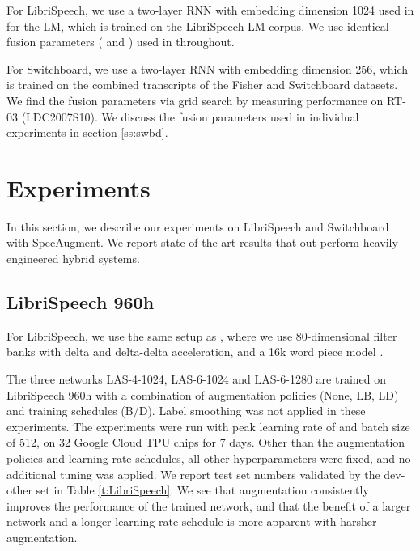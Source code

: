 \documentclass[a4paper]{article}
\begin{document}
For LibriSpeech, we use a two-layer RNN with embedding dimension 1024 used in \cite{irie-arxiv-2019} for the LM, which is trained on the LibriSpeech LM corpus. We use identical fusion parameters ( and ) used in \cite{irie-arxiv-2019} throughout.

For Switchboard, we use a two-layer RNN with embedding dimension 256, which is trained on the combined transcripts of the Fisher and Switchboard datasets. We find the fusion parameters via grid search by measuring performance on RT-03 (LDC2007S10). We discuss the fusion parameters used in individual experiments in section \ref{ss:swbd}.

\section{Experiments}

In this section, we describe our experiments on LibriSpeech and Switchboard with SpecAugment. We report state-of-the-art results that out-perform heavily engineered hybrid systems.

\subsection{LibriSpeech 960h} \label{ss:librispeech}

For LibriSpeech, we use the  same setup as \cite{irie-arxiv-2019}, where we use 80-dimensional filter banks with delta and delta-delta acceleration, and a 16k word piece model \cite{schuster-icassp-2012}.

The three networks LAS-4-1024, LAS-6-1024 and LAS-6-1280 are trained on LibriSpeech 960h with a combination of augmentation policies (None, LB, LD) and training schedules (B/D). Label smoothing was not applied in these experiments. The experiments were run with peak learning rate of  and batch size of 512, on 32 Google Cloud TPU chips for 7 days. Other than the augmentation policies and learning rate schedules, all other hyperparameters were fixed, and no additional tuning was applied. We report test set numbers validated by the dev-other set in Table \ref{t:LibriSpeech}. We see that augmentation consistently improves the performance of the trained network, and that the benefit of a larger network and a longer learning rate schedule is more apparent with harsher augmentation.
\end{document}
